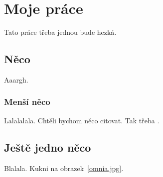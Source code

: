 \chapter{Moje práce}
Tato práce třeba jednou bude hezká.

\section{Něco}
Aaargh.
\subsection{Menší něco}
Lalalalala. Chtěli bychom něco citovat. Tak třeba \cite{baker}.
\section{Ještě jedno něco}
Blalala. Kukni na obrazek~\ref{omnia.jpg}.




